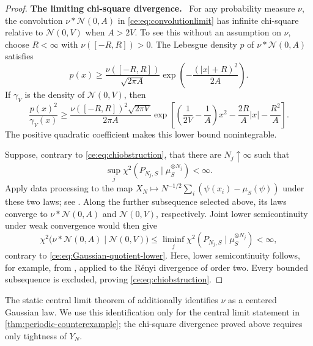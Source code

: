 \documentclass[11pt,reqno]{amsart}
\numberwithin{equation}{section}
\theoremstyle{plain}
\theoremstyle{remark}
\newcommand{\parheading}[1]{\par\medskip\noindent\textbf{#1}\ }
\begin{document}
\begin{proof}
\parheading{The limiting chi-square divergence.}
For any probability measure $\nu$, the convolution $\nu*\mathcal N(0,A)$ in \eqref{ce:eq:convolutionlimit} has infinite chi-square relative to $\mathcal N(0,V)$ when $A>2V$. To see this without an assumption on $\nu$, choose $R<\infty$ with $\nu([-R,R])>0$. The Lebesgue density $p$ of $\nu*\mathcal N(0,A)$ satisfies
\begin{equation}\label{ce:eq:convtaillower}
 p(x)\ge\frac{\nu([-R,R])}{\sqrt{2\pi A}}
 \exp\!\left(-\frac{(|x|+R)^2}{2A}\right).
\end{equation}
If $\gamma_V$ is the density of $\mathcal N(0,V)$, then
\begin{equation}\label{ce:eq:Gaussian-quotient-lower}
 \frac{p(x)^2}{\gamma_V(x)}
 \ge\frac{\nu([-R,R])^2\sqrt{2\pi V}}{2\pi A}
 \exp\left[\left(\frac1{2V}-\frac1A\right)x^2-\frac{2R}{A}|x|-\frac{R^2}{A}\right].
\end{equation}
The positive quadratic coefficient makes this lower bound nonintegrable.

Suppose, contrary to \eqref{ce:eq:chiobstruction}, that there are $N_j\uparrow\infty$ such that
\begin{equation}\label{ce:eq:bounded-chi-subsequence}
 \sup_j\chi^2(P_{N_j,S}\mid\mu_S^{\otimes N_j})<\infty.
\end{equation}
Apply data processing to the map $X_N\mapsto N^{-1/2}\sum_i(\psi(x_i)-\mu_S(\psi))$ under these two laws; see \cite[Section~2]{NishiyamaSason2020}. Along the further subsequence selected above, its laws converge to $\nu*\mathcal N(0,A)$ and $\mathcal N(0,V)$, respectively. Joint lower semicontinuity under weak convergence would then give
\begin{equation}\label{ce:eq:limiting-chi-contradiction}
 \chi^2\bigl(\nu*\mathcal N(0,A)\mid\mathcal N(0,V)\bigr)
 \le\liminf_j\chi^2(P_{N_j,S}\mid\mu_S^{\otimes N_j})<\infty,
\end{equation}
contrary to \eqref{ce:eq:Gaussian-quotient-lower}. Here, lower semicontinuity follows, for example, from \cite[Theorem~19 and~(6)]{vanErvenHarremoes2014}, applied to the R\'enyi divergence of order two. Every bounded subsequence is excluded, proving \eqref{ce:eq:chiobstruction}.
\end{proof}

The static central limit theorem of \cite[Proposition~2.11]{DGRpartition} additionally identifies $\nu$ as a centered Gaussian law. We use this identification only for the central limit statement in \cref{thm:periodic-counterexample}; the chi-square divergence proved above requires only tightness of $Y_N$.
\end{document}
